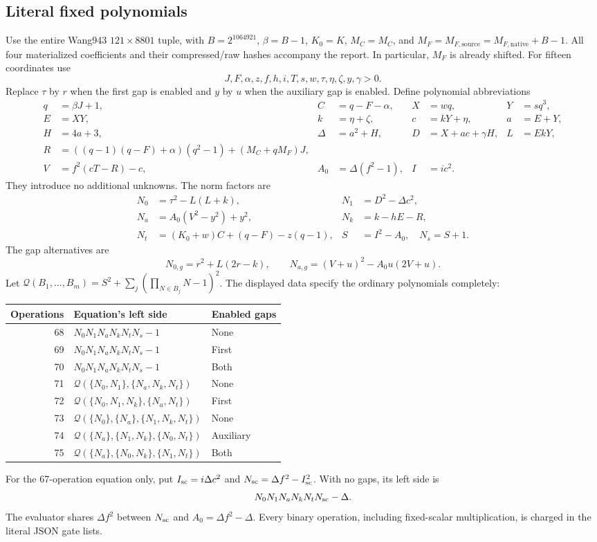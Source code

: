 \subsection{Literal fixed polynomials}
Use the entire Wang943 $121\times8801$ tuple, with
$B=2^{1064921}$, $\beta=B-1$, $K_0=K$, $M_C=M_C$, and
$M_F=M_{F,\mathrm{source}}=M_{F,\mathrm{native}}+B-1$.
All four materialized coefficients and their compressed/raw hashes accompany
the report. In particular, $M_F$ is already shifted.
For fifteen coordinates use
\[
 J,F,\alpha,z,f,h,i,T,s,w,\tau,\eta,\zeta,y,\gamma>0.
\]
Replace $\tau$ by $r$ when the first gap is enabled and $y$ by $u$
when the auxiliary gap is enabled. Define polynomial abbreviations
\begin{align*}
 q&=\beta J+1,& C&=q-F-\alpha,&X&=wq,&Y&=sq^3,\\
 E&=XY,& k&=\eta+\zeta,&c&=kY+\eta,&a&=E+Y,\\
 H&=4a+3,&\Delta&=a^2+H,&D&=X+ac+\gamma H,&L&=EkY,\\
 R&=((q-1)(q-F)+\alpha)(q^2-1)+(M_C+qM_F)J,\\
 V&=f^2(cT-R)-c,& A_0&=\Delta(f^2-1),&I&=ic^2.
\end{align*}
They introduce no additional unknowns. The norm factors are
\begin{align*}
 N_0&=\tau^2-L(L+k),&N_1&=D^2-\Delta c^2,\\
 N_a&=A_0(V^2-y^2)+y^2,&N_k&=k-hE-R,\\
 N_t&=(K_0+w)C+(q-F)-z(q-1),&S&=I^2-A_0,\quad N_s=S+1.
\end{align*}
The gap alternatives are
\[
 N_{0,g}=r^2+L(2r-k),\qquad
 N_{a,g}=(V+u)^2-A_0u(2V+u).
\]
Let $\mathcal Q(B_1,\ldots,B_m)=S^2+
\sum_j(\prod_{N\in B_j}N-1)^2$. The displayed data specify the ordinary
polynomials completely:
\begin{center}\small
\begin{tabular}{rll}
\toprule
Operations & Equation's left side & Enabled gaps\\\midrule
68&$N_0N_1N_aN_kN_tN_s-1$&None\\
69&$N_0N_1N_aN_kN_tN_s-1$&First\\
70&$N_0N_1N_aN_kN_tN_s-1$&Both\\
71&$\mathcal Q(\{N_0,N_1\},\{N_a,N_k,N_t\})$&None\\
72&$\mathcal Q(\{N_0,N_1,N_k\},\{N_a,N_t\})$&First\\
73&$\mathcal Q(\{N_0\},\{N_a\},\{N_1,N_k,N_t\})$&None\\
74&$\mathcal Q(\{N_a\},\{N_1,N_k\},\{N_0,N_t\})$&Auxiliary\\
75&$\mathcal Q(\{N_a\},\{N_0,N_k\},\{N_1,N_t\})$&Both\\\bottomrule
\end{tabular}\end{center}
For the 67-operation equation only, put $I_{\rm sc}=i\Delta c^2$ and
$N_{\rm sc}=\Delta f^2-I_{\rm sc}^2$. With no gaps, its left side is
\[
 N_0N_1N_aN_kN_tN_{\rm sc}-\Delta.
\]
The evaluator shares $\Delta f^2$ between $N_{\rm sc}$ and
$A_0=\Delta f^2-\Delta$. Every binary operation, including fixed-scalar
multiplication, is charged in the literal JSON gate lists.

